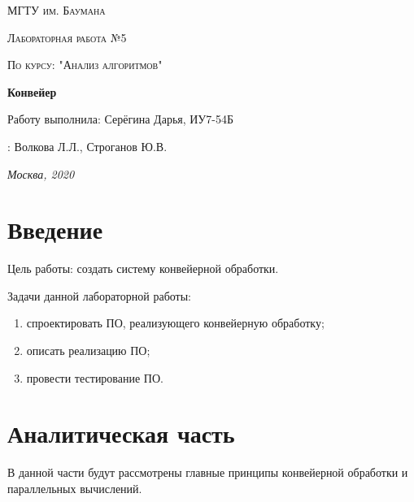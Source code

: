 \documentclass[12pt]{report}
\begin{document}
\begin{titlepage}
	\centering
	{\scshape\LARGE МГТУ им. Баумана \par}
	\vspace{3cm}
	{\scshape\Large Лабораторная работа №5\par}
	\vspace{0.5cm}	
	{\scshape\Large По курсу: "Анализ алгоритмов"\par}
	\vspace{1.5cm}
	{\huge\bfseries Конвейер \par}
	\vspace{2cm}
	\Large Работу выполнила: Серёгина Дарья, ИУ7-54Б\par
	\vspace{0.5cm}
	:  Волкова Л.Л., Строганов Ю.В.\par

	\vfill
	\large \textit {Москва, 2020} \par
\end{titlepage}

\tableofcontents

\newpage
\chapter*{Введение}
Цель работы: создать систему конвейерной обработки.

Задачи данной лабораторной работы:
\begin{enumerate}
        \item спроектировать ПО, реализующего конвейерную обработку;
        \item описать реализацию ПО;
        \item провести тестирование ПО.
\end{enumerate}



\chapter{Аналитическая часть}
В данной части будут рассмотрены главные принципы конвейерной обработки и параллельных вычислений.
\end{document}
